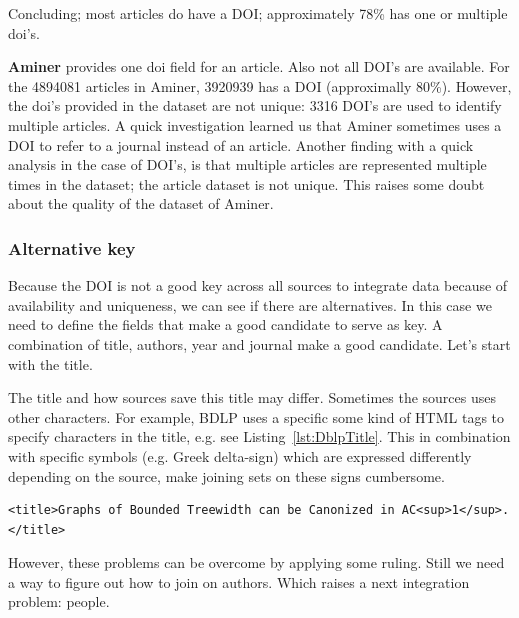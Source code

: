 \documentclass{ou-report}
\begin{document}
Concluding; most articles do have a DOI; approximately 78\% has one or multiple 
doi's.

\textbf{Aminer} provides one doi field for an article. Also not all DOI's are 
available. For the 4894081 articles in Aminer, 3920939 has a DOI (approximally 
80\%). However, the doi's provided in the dataset are not unique: 3316 DOI's are 
used to identify multiple articles. A quick investigation learned us that Aminer 
sometimes uses a DOI to refer to a journal instead of an article. Another 
finding with a quick analysis in the case of DOI's, is that multiple articles
are represented multiple times in the dataset; the article dataset is not 
unique. This raises some doubt about the quality of the dataset of Aminer.

\subsubsection{Alternative key}
Because the DOI is not a good key across all sources to integrate data because 
of
availability and uniqueness, we can see if there are alternatives. In this case
we need to define the fields that make a good candidate to serve as key. 
A combination of title, authors, year and journal make a good candidate.
Let's start with the title. 

The title and how sources save this title may differ. 
Sometimes the sources uses other characters. For example, BDLP uses a specific 
some kind of HTML tags to specify characters in the title, e.g. see 
Listing~\ref{lst:DblpTitle}. This in combination 
with specific symbols (e.g. Greek delta-sign) which are expressed differently 
depending on the source, make joining sets on these signs cumbersome.

\lstset{language=XML}
\begin{lstlisting}[caption={Example title in DBLP},label={lst:DblpTitle}]
<title>Graphs of Bounded Treewidth can be Canonized in AC<sup>1</sup>.</title>
\end{lstlisting}

However, these problems can be overcome by applying some ruling. Still we need a 
way to figure out how to join on authors. Which raises a next integration problem: 
people.

\end{document}

